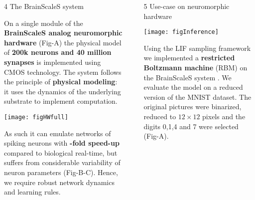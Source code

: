 \begin{frame}
\begin{columns}
\begin{column}{0.99\textwidth}
\begin{columns}[t]
\begin{column}{0.32\textwidth}
\begin{block}{\large 4 The BrainScaleS system}
					\justifying
					\begin{adjustwidth}{1.cm}{1.cm}
					 On a single module of the \textbf{BrainScaleS \cite{schemmel2010wafer} analog neuromorphic hardware} (Fig-A) the physical model of \textbf{200k neurons and 40 million synapses} is implemented using CMOS technology.
					 The system follows the principle of \textbf{physical modeling}: it uses the dynamics of the underlying substrate to implement computation.
					 
					\end{adjustwidth}

					\vspace{1.cm}
					\begin{center}
						\texttt{[image: figHWfull]}
					\end{center}

					\begin{adjustwidth}{1cm}{1cm}
					As such it can emulate networks of spiking neurons with \textbf{-fold speed-up} compared to biological real-time, but suffers from considerable variability of neuron parameters (Fig-B-C).
					Hence, we require robust network dynamics and learning rules.

					\end{adjustwidth}

					\blockSpaceOne
					\end{block}




				\end{column}

				\begin{column}{.01\textwidth}\end{column}

				\begin{column}{0.32\textwidth}

					\begin{block}{\large 5 Use-case on neuromorphic hardware}
					\blockSpaceTwo

					\begin{center}
						\texttt{[image: figInference]}
					\end{center}
					\thirdBlockImSpace

					\begin{adjustwidth}{1.cm}{1.cm}
					\justify
					 Using the LIF sampling framework we implemented a \textbf{restricted Boltzmann machine} (RBM) \cite{hinton1984boltzmann} on the BrainScaleS system \cite{kungl2019accelerated}.
					 We evaluate the model on a reduced version of the MNIST dataset.
					 The original pictures were binarized, reduced to $12\times12$ pixels and the digits 0,1,4 and 7 were selected (Fig-A).
					\end{adjustwidth}


\end{block}
\end{column}
\end{columns}
\end{column}
\end{columns}
\end{frame}
